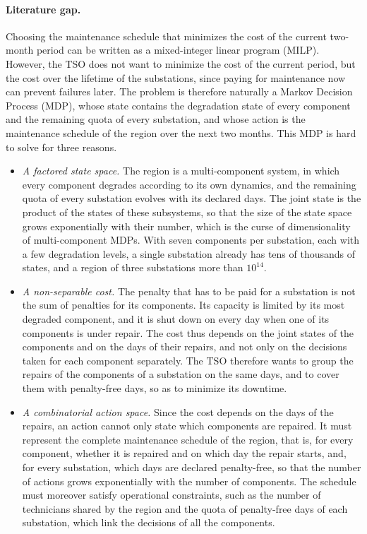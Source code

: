 \documentclass{article}
\begin{document}
\paragraph{Literature gap.} Choosing the maintenance schedule that minimizes the cost of the current two-month period
can be written as a mixed-integer linear program (MILP). However, the TSO does not want to minimize the cost of the
current period, but the cost over the lifetime of the substations, since paying for maintenance now can prevent
failures later. The problem is therefore naturally a Markov Decision Process (MDP), whose state
contains the degradation state of every component and the remaining quota of every substation, and whose action is the
maintenance schedule of the region over the next two months. This MDP is hard to solve for three reasons.
\begin{itemize}
\item \emph{A factored state space.} The region is a multi-component system, in which every
component degrades according to its own dynamics, and the remaining quota of every substation evolves with its declared days. The joint state is the product of the states of these subsystems, so that the size of the state space
grows exponentially with their number, which is the curse of dimensionality of multi-component MDPs. With seven
components per substation, each with a few degradation levels, a single substation already has tens of thousands of
states, and a region of three substations more than $10^{14}$.
\item \emph{A non-separable cost.} The penalty that has to be paid for a substation is not the sum of penalties for its components. Its capacity
is limited by its most degraded component, and it is shut down on every day when one of its components is under
repair. The cost thus depends on the joint states of the components and on the days of their repairs, and not only on
the decisions taken for each component separately. The TSO therefore wants to group the repairs of the components of a
substation on the same days, and to cover them with penalty-free days, so as to minimize its downtime.
\item \emph{A combinatorial action space.} Since the cost depends on the days of the repairs, an action cannot only
state which components are repaired. It must represent the complete maintenance schedule of the region, that is, for
every component, whether it is repaired and on which day the repair starts, and, for every substation, which days are
declared penalty-free, so that the number of actions grows exponentially with the number of components. The schedule
must moreover satisfy operational constraints, such as the number of technicians shared by the region and the quota of
penalty-free days of each substation, which link the decisions of all the components.
\end{itemize}
\end{document}
